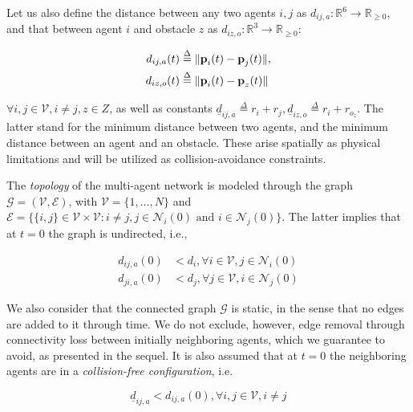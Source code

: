 Let us also define the distance between any two agents $i,j$ as
$d_{ij,a}: \mathbb{R}^6 \to \mathbb{R}_{\geq 0}$, and that between agent $i$
and obstacle $z$ as $d_{iz,o} : \mathbb{R}^3 \to \mathbb{R}_{\geq 0}$:

\begin{subequations}
	\begin{align}
    d_{ij,a}(t) &\overset{\Delta}{=} \| \bm{\mathbf{p}}_i(t) - \bm{\mathbf{p}}_j(t) \|, \\
    d_{iz,o}(t) &\overset{\Delta}{=} \| \bm{\mathbf{p}}_i(t) - \bm{\mathbf{p}}_z(t) \|
	\end{align}
\end{subequations}

$\forall i, j \in \mathcal{V}, i \neq j, z \in Z$, as well as
constants $\underline{d}_{ij, a} \overset{\Delta}{=} r_{i} + r_{j},
\underline{d}_{iz, o} \overset{\Delta}{=} r_{i} + r_{o_z}$. The latter stand for
the minimum distance between two agents, and the minimum distance between an
agent and an obstacle. These arise spatially as physical limitations and will
be utilized as collision-avoidance constraints.

The \textit{topology} of the multi-agent network is modeled through the graph
$\mathcal{G} = (\mathcal{V},\mathcal{E})$, with $\mathcal{V}=\{1,\dots,N\}$ and
$\mathcal{E}=\big\{\{i,j\}\in\mathcal{V}\times\mathcal{V} : i \neq j, j\in\mathcal{N}_i(0) \text{ and } i\in\mathcal{N}_j(0)\big\}$.
The latter implies that at $t=0$ the graph is undirected, i.e.,

\begin{align}
  d_{ij,a}(0) &< d_i, \forall i \in \mathcal{V}, j \in \mathcal{N}_i(0) \label{eq:initially_connected_0} \\
  d_{ji,a}(0) &< d_j, \forall j \in \mathcal{V}, i \in \mathcal{N}_j(0) \label{eq:initially_connected_1}
\end{align}

We also consider that the connected graph $\mathcal{G}$ is static, in the sense
that no edges are added to it through time. We do not exclude, however, edge
removal through connectivity loss between initially neighboring agents, which we
guarantee to avoid, as presented in the sequel. It is also assumed that at
$t=0$ the neighboring agents are in a \textit{collision-free configuration},
i.e.

\begin{equation}
  \underline{d}_{ij, a} < d_{ij,a}(0), \forall i,j \in \mathcal{V}, i \neq j
\label{eq:initially_coll_free}
\end{equation}


